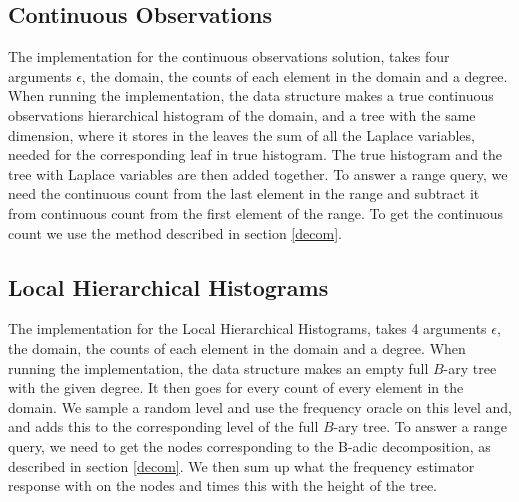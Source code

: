 \documentclass[11pt]{article}
\theoremstyle{definition}
\begin{document}
\subsection{Continuous Observations}
The implementation for the continuous observations solution, takes four arguments $\epsilon$, the domain, the counts of each element in the domain and a degree. 
When running the implementation, the data structure makes a true continuous observations hierarchical histogram of the domain, and a tree with the same dimension, where it stores in the leaves the sum of all the Laplace variables, needed for the corresponding leaf in true histogram. The true histogram and the tree with Laplace variables are then added together. To answer a range query, we need the continuous count from the last element in the range and subtract it from continuous count from the first element of the range. To get the continuous count we use the method described in section \ref{decom}. 

\subsection{Local Hierarchical Histograms}
The implementation for the Local Hierarchical Histograms, takes 4 arguments $\epsilon$, the domain, the counts of each element in the domain and a degree. 
When running the implementation, the data structure makes an empty full $B$-ary tree with the given degree. It then goes for every count of every element in the domain. We sample a random level and use the frequency oracle on this level and, and adds this to the corresponding level of the full $B$-ary tree. To answer a range query, we need to get the nodes corresponding to the B-adic decomposition, as described in section \ref{decom}. We then sum up what the frequency estimator response with on the nodes and times this with the height of the tree.
\end{document}
